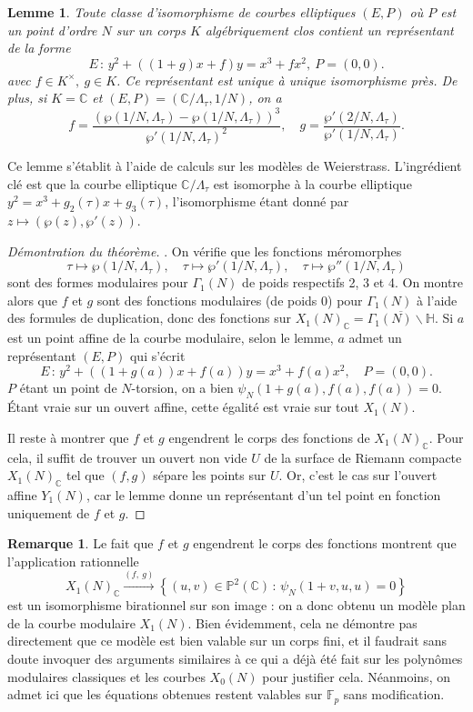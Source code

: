 \documentclass[11pt,a4paper]{article}
\newcommand{\C}{\mathbb{C}}
\newcommand{\F}{\mathbb{F}}
\renewcommand{\H}{\mathbb{H}}
\renewcommand{\P}{\mathbb{P}}
\newcommand{\vers}{\longrightarrow}
\newcommand{\de}{\,:\,}
\newtheorem*{lem}{Lemme}
\theoremstyle{definition}
\newtheorem*{rem}{Remarque}
\begin{document}
\begin{lem}
Toute classe d'isomorphisme de courbes elliptiques $(E, P)$ où $P$ est un point d'ordre $N$ sur un corps $K$ algébriquement clos contient un représentant de la forme
$$E\de y^2 + ((1+g) x + f)y = x^3 + fx^2,\ P = (0,0).$$
avec $f\in K^\times,\ g\in K$. Ce représentant est unique à unique isomorphisme près.
De plus, si $K=\C$ et $(E, P) = (\C/\Lambda_\tau, 1/N)$, on a
$$f = \frac{(\wp(1/N, \Lambda_\tau) - \wp(1/N, \Lambda_\tau))^3}{\wp'(1/N, \Lambda_\tau)^2}, \quad  g = \frac{\wp'(2/N, \Lambda_\tau)}{\wp'(1/N,\Lambda_\tau)}.$$
\end{lem}
Ce lemme s'établit à l'aide de calculs sur les modèles de Weierstrass. L'ingrédient clé est que la courbe elliptique $\C/\Lambda_\tau$ est isomorphe à la courbe elliptique $y^2 = x^3 + g_2(\tau) x + g_3(\tau)$, l'isomorphisme étant donné par 
$z\mapsto (\wp(z), \wp'(z))$.

\begin{proof}[Démontration du théorème]. On vérifie que les fonctions méromorphes
$$\tau\mapsto \wp(1/N, \Lambda_\tau),\quad \tau\mapsto\wp'(1/N,\Lambda_\tau),\quad \tau\mapsto\wp''(1/N, \Lambda_\tau)$$
sont des formes modulaires pour $\Gamma_1(N)$ de poids respectifs 2, 3 et 4. On montre alors que $f$ et $g$ sont des fonctions modulaires (de poids 0) pour $\Gamma_1(N)$ à l'aide des formules de duplication, donc des fonctions sur $X_1(N)_\C = \overline{\Gamma_1(N)\backslash \H}$. Si $a$ est un point affine de la courbe modulaire, selon le lemme, $a$ admet un représentant $(E, P)$ qui s'écrit
$$E\de y^2 + ((1 + g(a))x + f(a))y = x^3 + f(a)x^2,\quad P = (0, 0).$$
$P$ étant un point de $N$-torsion, on a bien $\psi_N(1+g(a), f(a), f(a)) = 0$. \'Etant vraie sur un ouvert affine, cette égalité est vraie sur tout $X_1(N)$.

Il reste à montrer que $f$ et $g$ engendrent le corps des fonctions de $X_1(N)_\C$. Pour cela, il suffit de trouver un ouvert non vide $U$ de la surface de Riemann compacte $X_1(N)_\C$ tel que $(f, g)$ sépare les points sur $U$. Or, c'est le cas sur l'ouvert affine $Y_1(N)$, car le lemme donne un représentant d'un tel point en fonction uniquement de $f$ et $g$.
\end{proof}

\begin{rem}
Le fait que $f$ et $g$ engendrent le corps des fonctions montrent que l'application rationnelle
$$X_1(N)_\C \overset{(f,\ g)}{\vers} \left\{(u, v)\in \P^2(\C) \de \psi_N(1+v, u, u) = 0\right\}$$
est un isomorphisme birationnel sur son image : on a donc obtenu un modèle plan de la courbe modulaire $X_1(N)$. Bien évidemment, cela ne démontre pas directement que ce modèle est bien valable sur un corps fini, et il faudrait sans doute invoquer des arguments similaires à ce qui a déjà été fait sur les polynômes modulaires classiques et les courbes $X_0(N)$ pour justifier cela. Néanmoins, on admet ici que les équations obtenues restent valables sur $\F_p$ sans modification.
\end{rem}
\end{document}
